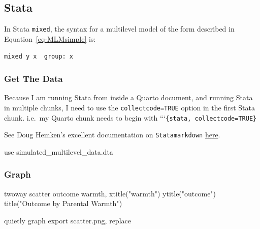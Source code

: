 \documentclass[
  letterpaper,
  DIV=11,
  numbers=noendperiod]{scrreprt}
\newenvironment{Shaded}{\begin{snugshade}}{\end{snugshade}}
\newcommand{\BaseNTok}[1]{\textcolor[rgb]{0.68,0.00,0.00}{#1}}
\newcommand{\KeywordTok}[1]{\textcolor[rgb]{0.00,0.23,0.31}{#1}}
\newcommand{\NormalTok}[1]{\textcolor[rgb]{0.00,0.23,0.31}{#1}}
\newcommand{\StringTok}[1]{\textcolor[rgb]{0.13,0.47,0.30}{#1}}
\begin{document}
\subsection{Stata}

In Stata \texttt{mixed}, the syntax for a multilevel model of the form
described in Equation~\ref{eq-MLMsimple} is:

\texttt{mixed\ y\ x\ \textbar{}\textbar{}\ group:\ x}

\hypertarget{get-the-data}{%
\subsubsection{Get The Data}\label{get-the-data}}

\begin{tcolorbox}[enhanced jigsaw, coltitle=black, breakable, toptitle=1mm, opacityback=0, opacitybacktitle=0.6, colframe=quarto-callout-tip-color-frame, titlerule=0mm, left=2mm, leftrule=.75mm, arc=.35mm, bottomrule=.15mm, bottomtitle=1mm, colbacktitle=quarto-callout-tip-color!10!white, title=\textcolor{quarto-callout-tip-color}{\faLightbulb}\hspace{0.5em}{Tip For Running Stata From Quarto}, toprule=.15mm, rightrule=.15mm, colback=white]

Because I am running Stata from inside a Quarto document, and running
Stata in multiple chunks, I need to use the \texttt{collectcode=TRUE}
option in the first Stata chunk. i.e.~my Quarto chunk needs to begin
with ```\texttt{\{stata,\ collectcode=TRUE\}}

See Doug Hemken's excellent documentation on \texttt{Statamarkdown}
\href{https://www.ssc.wisc.edu/~hemken/Stataworkshops/Statamarkdown/linking-code-blocks.html\#linking-code-blocks-1}{here}.

\end{tcolorbox}

\begin{Shaded}
\begin{Highlighting}[]

\KeywordTok{use}\NormalTok{ simulated\_multilevel\_data.dta}
\end{Highlighting}
\end{Shaded}

\hypertarget{graph}{%
\subsubsection{Graph}\label{graph}}

\begin{Shaded}
\begin{Highlighting}[]
\KeywordTok{twoway} \KeywordTok{scatter}\NormalTok{ outcome warmth, }\BaseNTok{xtitle}\NormalTok{(}\StringTok{"warmth"}\NormalTok{) }\BaseNTok{ytitle}\NormalTok{(}\StringTok{"outcome"}\NormalTok{) }\BaseNTok{title}\NormalTok{(}\StringTok{"Outcome by Parental Warmth"}\NormalTok{) }

\KeywordTok{quietly} \KeywordTok{graph} \KeywordTok{export} \KeywordTok{scatter}\NormalTok{.png, }\KeywordTok{replace}
\end{Highlighting}
\end{Shaded}
\end{document}
